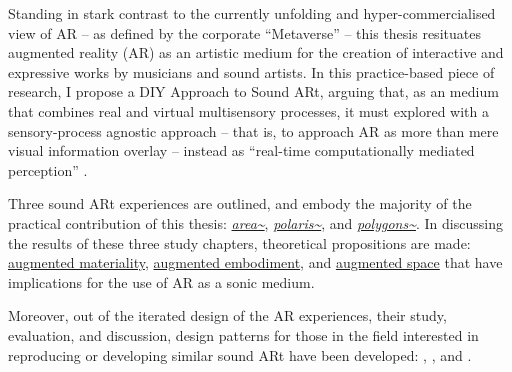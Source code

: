     \noindent Standing in stark contrast to the currently unfolding and hyper-commercialised view of AR --  as defined by the corporate ``Metaverse'' --  this thesis resituates augmented reality (AR) as an artistic medium for the creation of interactive and expressive works by musicians and sound artists. In this practice-based piece of research, I propose a DIY Approach to Sound ARt, arguing that, as an medium that combines real and virtual multisensory processes, it must explored with a sensory-process agnostic approach -- that is, to approach AR as more than mere visual information overlay -- instead as ``real-time computationally mediated perception'' \citep{chevalier2020}.
    
    \noindent Three sound ARt experiences are outlined, and embody the majority of the practical contribution of this thesis: \textit{\hyperref[sec: area]{area\textasciitilde{}}}, \textit{\hyperref[sec: polaris]{polaris\textasciitilde{}}}, and \textit{\hyperref[sec: polygons]{polygons\textasciitilde{}}}. In discussing the results of these three study chapters, theoretical propositions are made: \hyperref[sec: discussion-medium-material]{augmented materiality}, \hyperref[sec: discussion-medium-embodiment]{augmented embodiment}, and \hyperref[sec: discussion-medium-space]{augmented space} that have implications for the use of AR as a sonic medium.
    
    \noindent Moreover, out of the iterated design of the AR experiences, their study, evaluation, and discussion, design patterns for those in the field interested in reproducing or developing similar sound ARt have been developed: \textit{}, \textit{}, and \textit{}. 
